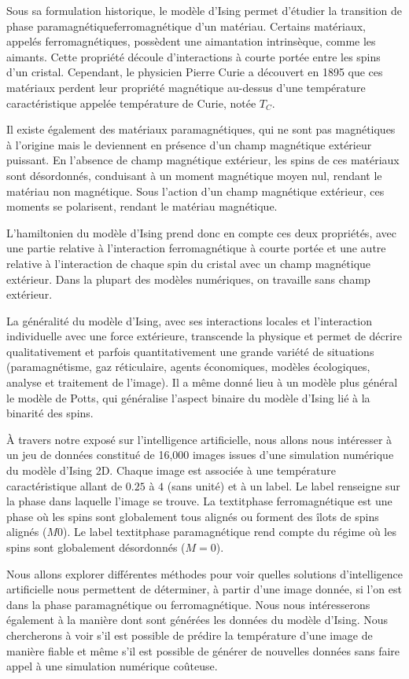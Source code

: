 Sous sa formulation historique, le modèle d'Ising permet d'étudier la transition de phase paramagnétiqueferromagnétique d'un matériau. Certains matériaux, appelés ferromagnétiques, possèdent une aimantation intrinsèque, comme les aimants. Cette propriété découle d'interactions à courte portée entre les spins d'un cristal. Cependant, le physicien Pierre Curie a découvert en 1895 que ces matériaux perdent leur propriété magnétique au-dessus d'une température caractéristique appelée température de Curie, notée $T_C$.

Il existe également des matériaux paramagnétiques, qui ne sont pas magnétiques à l'origine mais le deviennent en présence d'un champ magnétique extérieur puissant. En l'absence de champ magnétique extérieur, les spins de ces matériaux sont désordonnés, conduisant à un moment magnétique moyen nul, rendant le matériau non magnétique. Sous l'action d'un champ magnétique extérieur, ces moments se polarisent, rendant le matériau magnétique.

L'hamiltonien du modèle d'Ising prend donc en compte ces deux propriétés, avec une partie relative à l'interaction ferromagnétique à courte portée et une autre relative à l'interaction de chaque spin du cristal avec un champ magnétique extérieur. Dans la plupart des modèles numériques, on travaille sans champ extérieur.

La généralité du modèle d'Ising, avec ses interactions locales et l'interaction individuelle avec une force extérieure, transcende la physique et permet de décrire qualitativement et parfois quantitativement une grande variété de situations (paramagnétisme, gaz réticulaire, agents économiques, modèles écologiques, analyse et traitement de l'image). Il a même donné lieu à un modèle plus général  le modèle de Potts, qui généralise l'aspect binaire du modèle d'Ising lié à la binarité des spins.

À travers notre exposé sur l'intelligence artificielle, nous allons nous intéresser à un jeu de données constitué de 16,000 images issues d'une simulation numérique du modèle d'Ising 2D. Chaque image est associée à une température caractéristique allant de $0.25$ à $4$ (sans unité) et à un label. Le label renseigne sur la phase dans laquelle l'image se trouve. La textit{phase ferromagnétique} est une phase où les spins sont globalement tous alignés ou forment des îlots de spins alignés ($M  0$). Le label textit{phase paramagnétique} rend compte du régime où les spins sont globalement désordonnés ($M = 0$).

Nous allons explorer différentes méthodes pour voir quelles solutions d'intelligence artificielle nous permettent de déterminer, à partir d'une image donnée, si l'on est dans la phase paramagnétique ou ferromagnétique. Nous nous intéresserons également à la manière dont sont générées les données du modèle d'Ising. Nous chercherons à voir s'il est possible de prédire la température d'une image de manière fiable et même s'il est possible de générer de nouvelles données sans faire appel à une simulation numérique coûteuse.

